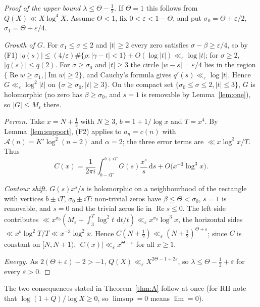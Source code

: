 \documentclass[11pt]{amsart}
\theoremstyle{remark}
\theoremstyle{definition}
\newcommand{\dd}{\,\mathrm{d}}
\renewcommand{\Re}{\operatorname{Re}}
\renewcommand{\Im}{\operatorname{Im}}
\begin{document}
\begin{proof}[Proof of the upper bound $\lambda\le\Theta-\frac12$]
If $\Theta=1$ this follows from $Q(X)\ll X\log^4X$. Assume $\Theta<1$, fix $0<\varepsilon<1-\Theta$, and put $\sigma_0=\Theta+\varepsilon/2$, $\sigma_1=\Theta+\varepsilon/4$.

\emph{Growth of $G$.} For $\sigma_1\le\sigma\le2$ and $|t|\ge2$ every zero satisfies $\sigma-\beta\ge\varepsilon/4$, so by (F1) $|q(s)|\le(4/\varepsilon)\#\{\rho:|\gamma-t|<1\}+O(\log|t|)\ll_\varepsilon\log|t|$; for $\sigma\ge2$, $|q(s)|\le q(2)$. For $\sigma\ge\sigma_0$ and $|t|\ge3$ the circle $|w-s|=\varepsilon/4$ lies in the region $\{\Re w\ge\sigma_1,|\Im w|\ge2\}$, and Cauchy's formula gives $q'(s)\ll_\varepsilon\log|t|$. Hence $G\ll_\varepsilon\log^2|t|$ on $\{\sigma\ge\sigma_0,|t|\ge3\}$. On the compact set $\{\sigma_0\le\sigma\le2,|t|\le3\}$, $G$ is holomorphic (no zero has $\beta\ge\sigma_0$, and $s=1$ is removable by Lemma~\ref{lem:one}), so $|G|\le M_\varepsilon$ there.

\emph{Perron.} Take $x=N+\frac12$ with $N\ge3$, $b=1+1/\log x$ and $T=x^4$. By Lemma~\ref{lem:support}, (F2) applies to $a_n=c(n)$ with $\mathcal A(n)=K'\log^2(n+2)$ and $\alpha=2$; the three error terms are $\ll x\log^3x/T$. Thus
\[
C(x)=\frac1{2\pi i}\int_{b-iT}^{b+iT}G(s)\frac{x^s}{s}\dd s+O\big(x^{-3}\log^3x\big).
\]

\emph{Contour shift.} $G(s)x^s/s$ is holomorphic on a neighbourhood of the rectangle with vertices $b\pm iT$, $\sigma_0\pm iT$: non-trivial zeros have $\beta\le\Theta<\sigma_0$, $s=1$ is removable, and $s=0$ and the trivial zeros lie in $\Re s\le0$. The left side contributes $\ll x^{\sigma_0}(M_\varepsilon+\int_3^T\log^2t\,\dd t/t)\ll_\varepsilon x^{\sigma_0}\log^3x$, the horizontal sides $\ll x^b\log^2T/T\ll x^{-3}\log^2x$. Hence $C(N+\frac12)\ll_\varepsilon(N+\frac12)^{\Theta+\varepsilon}$; since $C$ is constant on $[N,N+1)$, $|C(x)|\ll_\varepsilon x^{\Theta+\varepsilon}$ for all $x\ge1$.

\emph{Energy.} As $2(\Theta+\varepsilon)-2>-1$, $Q(X)\ll_\varepsilon X^{2\Theta-1+2\varepsilon}$, so $\lambda\le\Theta-\frac12+\varepsilon$ for every $\varepsilon>0$.
\end{proof}

The two consequences stated in Theorem~\ref{thm:A} follow at once (for RH note that $\log(1+Q)/\log X\ge0$, so $\limsup=0$ means $\lim=0$).
\end{document}
